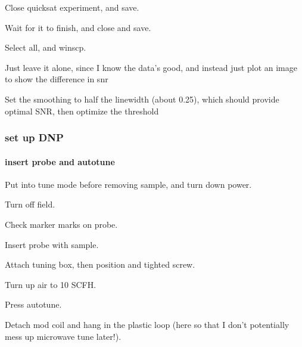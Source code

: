 {{
Close quicksat experiment, and save.

Wait for it to finish, and close and save.

Select all, and winscp.

Just leave it alone, since I know the data's good, and instead just plot an image to show the difference in snr

Set the smoothing to half the linewidth (about 0.25), which should provide optimal SNR, then optimize the threshold



\begin{tiny}
\end{tiny}


}
}
\subsubsection{set up DNP}
\paragraph{insert probe and autotune}
Put into tune mode before removing sample, and turn down power.

Turn off field.

Check marker marks on probe.

Insert probe with sample.

Attach tuning box, then position and tighted screw.

Turn up air to 10 SCFH.

Press autotune.

Detach mod coil and hang in the plastic loop (here so that I don't potentially mess up microwave tune later!).

